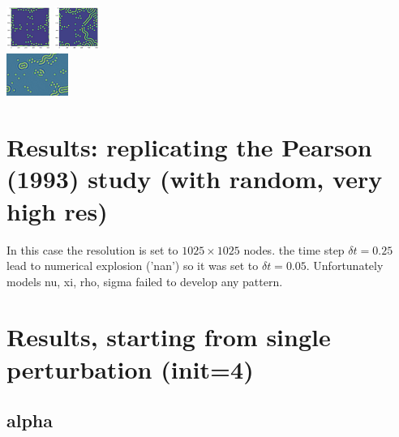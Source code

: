 \begin{itemize}
\includegraphics[height=1.4cm]{python_codes/fieldstone_171/pearson93_hr/pi_solution_0075000_u.png}
\includegraphics[height=1.4cm]{python_codes/fieldstone_171/pearson93_hr/pi_solution_final_u.png}\\
\includegraphics[height=1.4cm]{python_codes/fieldstone_171/images/munafo_pi}

\end{itemize}


\section*{Results: replicating the Pearson (1993) study (with random, very high res)}

In this case the resolution is set to $1025\times 1025$ nodes.
the time step $\delta t=0.25$ lead to numerical explosion ('nan') so 
it was set to $\delta t=0.05$.
Unfortunately models nu, xi, rho, sigma failed to develop any pattern.



\newpage
\section*{Results, starting from single perturbation (init=4)}

\subsection*{alpha}

